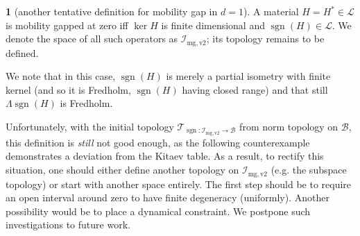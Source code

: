 \documentclass[a4paper,10pt]{article}
\numberwithin{equation}{section}
\theoremstyle{plain}
\theoremstyle{plain}
\theoremstyle{plain}
\theoremstyle{plain}
\theoremstyle{plain}
\theoremstyle{remark}
\theoremstyle{definition}
\newtheorem{defn}[thm]{\protect\definitionname}
\theoremstyle{plain}
\providecommand{\definitionname}{Definition}
\newcommand{\calB}{\mathcal{B}}
\newcommand{\calL}{\mathcal{L}}
\newcommand{\calI}{\mathcal{I}}
\newcommand{\bbLambda}{\mathbb{\Lambda}}
\newcommand{\sgn}{\operatorname{sgn}}
\newcommand{\calT}{\mathcal{T}}
\begin{document}
	\begin{defn}[another tentative definition for mobility gap in $d=1$] A material $H=H^\ast\in\calL$ is mobility gapped at zero iff $\ker H$ is finite dimensional and  $\sgn(H)\in\calL$. We denote the space of all such operators as $\calI_{\mathrm{mg,v2}}$; its topology remains to be defined.
	\end{defn}
	
	We note that in this case, $\sgn(H)$ is merely a partial isometry with finite kernel (and so it is Fredholm, $\sgn(H)$ having closed range) and that still $\bbLambda \sgn(H)$ is Fredholm.
	
	Unfortunately, with the initial topology $\calT_{\sgn:\calI_{\mathrm{mg,v2}}\to\calB}$ from norm topology on $\calB$, this definition is \emph{still} not good enough, as the following counterexample demonstrates a deviation from the Kitaev table. As a result, to rectify this situation, one should either define another topology on $\calI_{\mathrm{mg,v2}}$ (e.g. the subspace topology) or start with another space entirely. The first step should be to require an open interval around zero to have finite degeneracy (uniformly). Another possibility would be to place a dynamical constraint. We postpone such investigations to future work.
	
\end{document}
